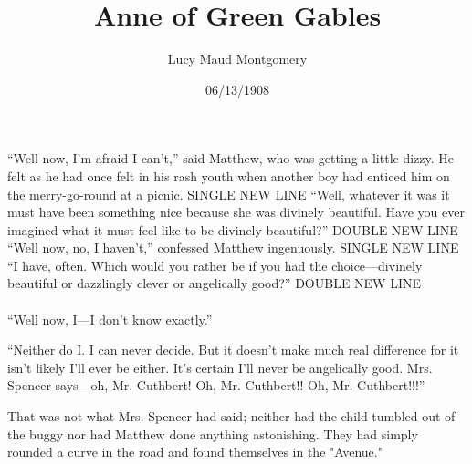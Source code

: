 \documentclass[a4paper]{article}
\title{Anne of Green Gables}
\author{Lucy Maud Montgomery}
\date{06/13/1908}
\begin{document}
\maketitle
``Well now, I'm afraid I can't,'' said Matthew, who was getting a little dizzy. He felt as he had once felt in his rash youth when another boy had enticed him on the merry-go-round at a picnic. SINGLE NEW LINE \newline ``Well, whatever it was it must have been something nice because she was divinely beautiful. Have you ever imagined what it must feel like to be divinely beautiful?'' DOUBLE NEW LINE \newline \newline ``Well now, no, I haven't,'' confessed Matthew ingenuously. SINGLE NEW LINE\\``I have, often. Which would you rather be if you had the choice---divinely beautiful or dazzlingly clever or angelically good?'' DOUBLE NEW LINE\\\\``Well now, I---I don't know exactly.''

``Neither do I. I can never decide. But it doesn't make much real difference for it isn't likely I'll ever be either. It's certain I'll never be angelically good. Mrs. Spencer says---oh, Mr. Cuthbert! Oh, Mr. Cuthbert!! Oh, Mr. Cuthbert!!!''

That was not what Mrs. Spencer had said; neither had the child tumbled out of the buggy nor had Matthew done anything astonishing. They had simply rounded a curve in the road and found themselves in the "Avenue."
\end{document}
